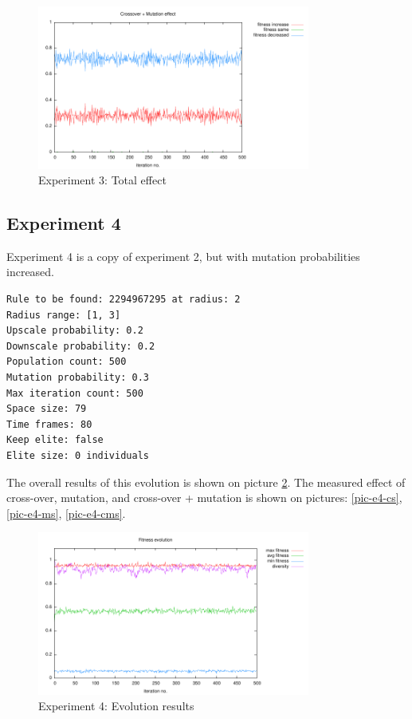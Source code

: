 \documentclass[12pt,a4paper]{article}
\begin{document}
\begin{figure}
\centering
\includegraphics[width=0.8\textwidth]{results/3/1-cms.pdf}
\caption{Experiment 3: Total effect}
\label{pic-e3-cms}
\end{figure}




\subsection{Experiment 4}
Experiment 4 is a copy of experiment 2, but with mutation probabilities increased.

\begin{verbatim}
Rule to be found: 2294967295 at radius: 2
Radius range: [1, 3]
Upscale probability: 0.2
Downscale probability: 0.2
Population count: 500
Mutation probability: 0.3
Max iteration count: 500
Space size: 79
Time frames: 80
Keep elite: false
Elite size: 0 individuals
\end{verbatim}

The overall results of this evolution is shown on picture \ref{pic-e4-results}. The measured effect of cross-over, mutation, and cross-over + mutation is shown on pictures: \ref{pic-e4-cs}, \ref{pic-e4-ms}, \ref{pic-e4-cms}.

\begin{figure}
\centering
\includegraphics[width=0.8\textwidth]{results/4/1.pdf}
\caption{Experiment 4: Evolution results}
\label{pic-e4-results}
\end{figure}
\end{document}

